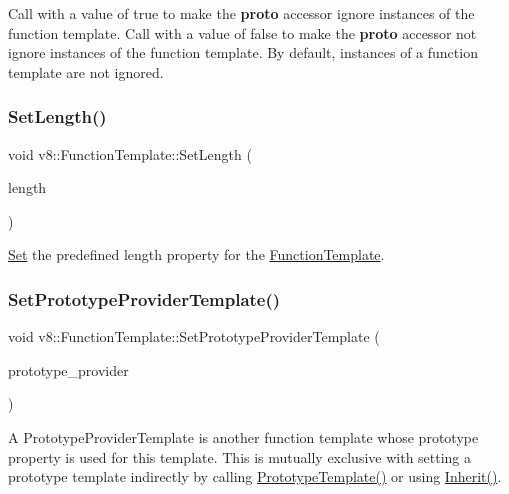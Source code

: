 Call with a value of true to make the {\bfseries proto} accessor ignore instances of the function template. Call with a value of false to make the {\bfseries proto} accessor not ignore instances of the function template. By default, instances of a function template are not ignored. \mbox{\label{classv8_1_1FunctionTemplate_a5faf23b28ee3480b23ce054d0f389a75}} 
\subsubsection{\texorpdfstring{Set\+Length()}{SetLength()}}
{\footnotesize\ttfamily void v8\+::\+Function\+Template\+::\+Set\+Length (\begin{DoxyParamCaption}\item[{int}]{length }\end{DoxyParamCaption})}

\mbox{\hyperlink{classv8_1_1Set}{Set}} the predefined length property for the \mbox{\hyperlink{classv8_1_1FunctionTemplate}{Function\+Template}}. \mbox{\label{classv8_1_1FunctionTemplate_abbe5fd8e3688db6dfb3793f9a48aa372}} 
\subsubsection{\texorpdfstring{Set\+Prototype\+Provider\+Template()}{SetPrototypeProviderTemplate()}}
{\footnotesize\ttfamily void v8\+::\+Function\+Template\+::\+Set\+Prototype\+Provider\+Template (\begin{DoxyParamCaption}\item[{\mbox{\hyperlink{classv8_1_1Local}{Local}}$<$ \mbox{\hyperlink{classv8_1_1FunctionTemplate}{Function\+Template}} $>$}]{prototype\+\_\+provider }\end{DoxyParamCaption})}

A Prototype\+Provider\+Template is another function template whose prototype property is used for this template. This is mutually exclusive with setting a prototype template indirectly by calling \mbox{\hyperlink{classv8_1_1FunctionTemplate_aa2bcc2652b5f0fdbc666d943ccf72021}{Prototype\+Template()}} or using \mbox{\hyperlink{classv8_1_1FunctionTemplate_abc11c462facf11bafd541892815c5425}{Inherit()}}. \mbox{\label{classv8_1_1FunctionTemplate_abd995d08f790cadf070d0fbd2af34b50}} 
